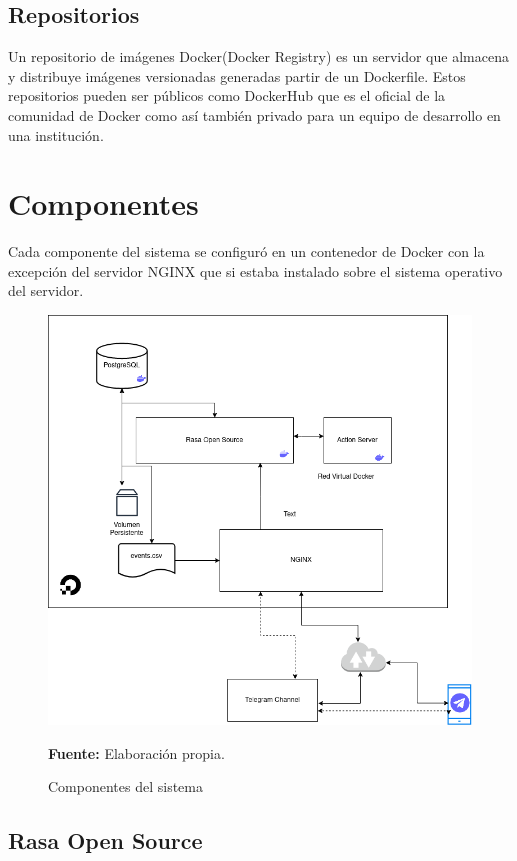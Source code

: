 \subsection{Repositorios}
Un repositorio de imágenes Docker(Docker Registry) es un servidor que almacena y distribuye
imágenes versionadas generadas partir de un Dockerfile. Estos repositorios pueden ser públicos como
DockerHub que es el oficial de la comunidad de Docker como así también privado para un equipo de
desarrollo en una institución.
\cite{Docker}

\section{Componentes}

Cada componente del sistema se configuró en un contenedor de Docker con la excepción del servidor
NGINX que si estaba instalado sobre el sistema operativo del servidor.
\begin{figure}[ht]
	\centering
	\includegraphics[width=\textwidth]{imagenes/cap4/server.png}
	\caption{Componentes del sistema}
  \textbf{Fuente:} Elaboración propia.
	\label{fig:server_diagram}
\end{figure}

\subsection{Rasa Open Source}


